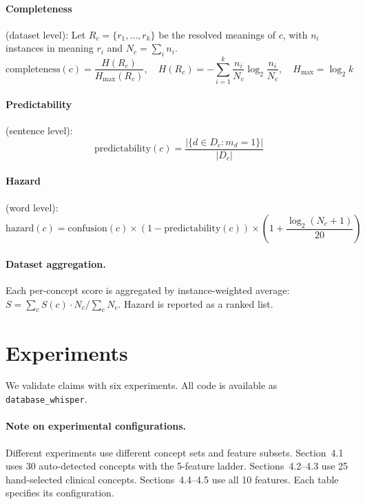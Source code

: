 \documentclass[11pt,a4paper]{article}
\begin{document}
\paragraph{Completeness} (dataset level): Let $R_c = \{r_1, \ldots, r_k\}$ be the resolved meanings of $c$, with $n_i$ instances in meaning $r_i$ and $N_c = \sum_i n_i$.
\begin{equation}
\text{completeness}(c) = \frac{H(R_c)}{H_{\max}(R_c)}, \quad H(R_c) = -\sum_{i=1}^{k} \frac{n_i}{N_c} \log_2 \frac{n_i}{N_c}, \quad H_{\max} = \log_2 k
\end{equation}

\paragraph{Predictability} (sentence level):
\begin{equation}
\text{predictability}(c) = \frac{|\{d \in D_c : m_d = 1\}|}{|D_c|}
\end{equation}

\paragraph{Hazard} (word level):
\begin{equation}
\text{hazard}(c) = \text{confusion}(c) \times (1 - \text{predictability}(c)) \times \left(1 + \frac{\log_2(N_c + 1)}{20}\right)
\end{equation}

\paragraph{Dataset aggregation.} Each per-concept score is aggregated by instance-weighted average: $S = \sum_c S(c) \cdot N_c / \sum_c N_c$. Hazard is reported as a ranked list.

\section{Experiments}

We validate claims with six experiments. All code is available as \texttt{database\_whisper}.

\paragraph{Note on experimental configurations.} Different experiments use different concept sets and feature subsets. Section~4.1 uses 30 auto-detected concepts with the 5-feature ladder. Sections~4.2--4.3 use 25 hand-selected clinical concepts. Sections~4.4--4.5 use all 10 features. Each table specifies its configuration.
\end{document}
